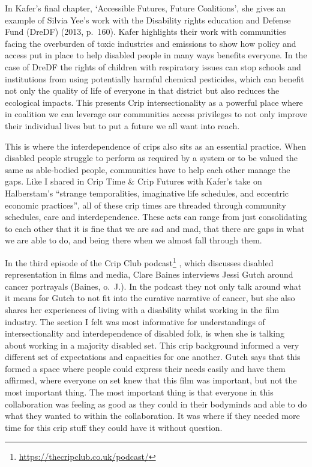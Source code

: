 In Kafer's final chapter, `Accessible Futures, Future Coalitions', she
gives an example of Silvia Yee's work with the Disability rights
education and Defense Fund (DreDF) (2013, p.~160). Kafer highlights
their work with communities facing the overburden of toxic industries
and emissions to show how policy and access put in place to help
disabled people in many ways benefits everyone. In the case of DreDF the
rights of children with respiratory issues can stop schools and
institutions from using potentially harmful chemical pesticides, which
can benefit not only the quality of life of everyone in that district
but also reduces the ecological impacts. This presents Crip
intersectionality as a powerful place where in coalition we can leverage
our communities access privileges to not only improve their individual
lives but to put a future we all want into reach.

This is where the interdependence of crips also sits as an essential
practice. When disabled people struggle to perform as required by a
system or to be valued the same as able-bodied people, communities have
to help each other manage the gaps. Like I shared in Crip Time \& Crip
Futures with Kafer's take on Halberstam's ``strange temporalities,
imaginative life schedules, and eccentric economic practices'', all of
these crip times are threaded through community schedules, care and
interdependence. These acts can range from just consolidating to each
other that it is fine that we are sad and mad, that there are gaps in
what we are able to do, and being there when we almost fall through
them.

In the third episode of the Crip Club podcast\footnote{\url{https://thecripclub.co.uk/podcast/}}
, which discusses disabled representation in films and media, Clare
Baines interviews Jessi Gutch around cancer portrayals (Baines, o.~J.).
In the podcast they not only talk around what it means for Gutch to not
fit into the curative narrative of cancer, but she also shares her
experiences of living with a disability whilst working in the film
industry. The section I felt was most informative for understandings of
intersectionality and interdependence of disabled folk, is when she is
talking about working in a majority disabled set. This crip background
informed a very different set of expectations and capacities for one
another. Gutch says that this formed a space where people could express
their needs easily and have them affirmed, where everyone on set knew
that this film was important, but not the most important thing. The most
important thing is that everyone in this collaboration was feeling as
good as they could in their bodyminds and able to do what they wanted to
within the collaboration. It was where if they needed more time for this
crip stuff they could have it without question.

